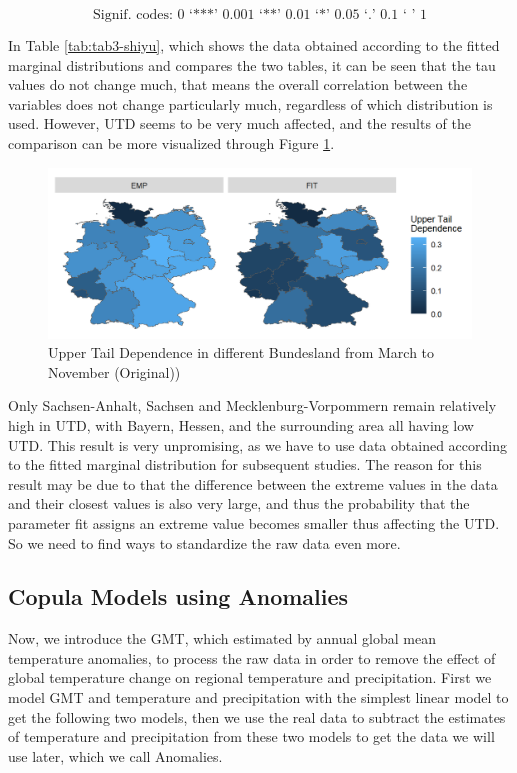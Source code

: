 \documentclass[
]{krantz}
\begin{document}
\[\text{Signif. codes: 0 ‘***’ 0.001 ‘**’ 0.01 ‘*’ 0.05 ‘.’ 0.1 ‘ ’ 1}\]

In Table \ref{tab:tab3-shiyu}, which shows the data obtained according to the fitted marginal distributions and compares the two tables, it can be seen that the tau values do not change much, that means the overall correlation between the variables does not change particularly much, regardless of which distribution is used. However, UTD seems to be very much affected, and the results of the comparison can be more visualized through Figure \ref{fig:utdmap1-shiyu}.

\begin{figure}

{\centering \includegraphics[width=0.8\linewidth]{work/03-compounds/figures/UTDMAP/original} 

}

\caption{Upper Tail Dependence in different Bundesland from March to November (Original))}\label{fig:utdmap1-shiyu}
\end{figure}

Only Sachsen-Anhalt, Sachsen and Mecklenburg-Vorpommern remain relatively high in UTD, with Bayern, Hessen, and the surrounding area all having low UTD. This result is very unpromising, as we have to use data obtained according to the fitted marginal distribution for subsequent studies. The reason for this result may be due to that the difference between the extreme values in the data and their closest values is also very large, and thus the probability that the parameter fit assigns an extreme value becomes smaller thus affecting the UTD. So we need to find ways to standardize the raw data even more.

\subsection{Copula Models using Anomalies}\label{copula-models-using-anomalies}

Now, we introduce the GMT, which estimated by annual global mean temperature anomalies, to process the raw data in order to remove the effect of global temperature change on regional temperature and precipitation. First we model GMT and temperature and precipitation with the simplest linear model to get the following two models, then we use the real data to subtract the estimates of temperature and precipitation from these two models to get the data we will use later, which we call Anomalies.
\end{document}
